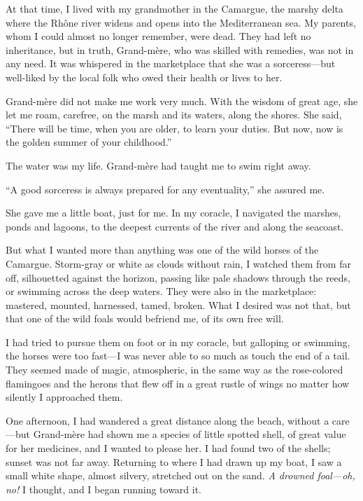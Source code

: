 At that time, I lived with my grandmother in the Camargue, the marshy
delta where the Rhône river widens and opens into the Mediterranean sea.
My parents, whom I could almost no longer remember, were dead. They had
left no inheritance, but in truth, Grand-mère, who was skilled with
remedies, was not in any need. It was whispered in the marketplace that
she was a sorceress---but well-liked by the local folk who owed their
health or lives to her.

Grand-mère did not make me work very much. With the wisdom of great age,
she let me roam, carefree, on the marsh and its waters, along the
shores. She said, ``There will be time, when you are older, to learn
your duties. But now, now is the golden summer of your childhood.''

The water was my life. Grand-mère had taught me to swim right away.

``A good sorceress is always prepared for any eventuality,'' she assured
me.

She gave me a little boat, just for me. In my coracle, I navigated the
marshes, ponds and lagoons, to the deepest currents of the river and
along the seacoast.

But what I wanted more than anything was one of the wild horses of the
Camargue. Storm-gray or white as clouds without rain, I watched them
from far off, silhouetted against the horizon, passing like pale shadows
through the reeds, or swimming across the deep waters. They were also in
the marketplace: mastered, mounted, harnessed, tamed, broken. What I
desired was not that, but that one of the wild foals would befriend me,
of its own free will.

I had tried to pursue them on foot or in my coracle, but galloping or
swimming, the horses were too fast---I was never able to so much as
touch the end of a tail. They seemed made of magic, atmospheric, in the
same way as the rose-colored flamingoes and the herons that flew off in
a great rustle of wings no matter how silently I approached them.

One afternoon, I had wandered a great distance along the beach, without
a care---but Grand-mère had shown me a species of little spotted shell,
of great value for her medicines, and I wanted to please her. I had
found two of the shells; sunset was not far away. Returning to where I
had drawn up my boat, I saw a small white shape, almost silvery,
stretched out on the sand. \emph{A drowned foal---oh, no!} I thought,
and I began running toward it.

